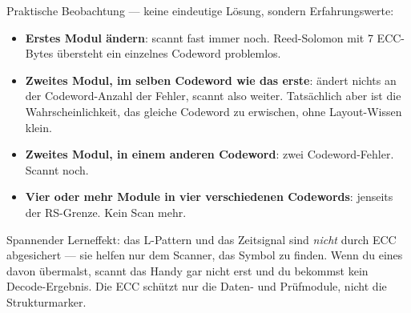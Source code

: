 Praktische Beobachtung — keine eindeutige Lösung, sondern Erfahrungswerte:

\begin{itemize}
\item \textbf{Erstes Modul ändern}: scannt fast immer noch.
  Reed-Solomon mit 7 ECC-Bytes übersteht ein einzelnes Codeword
  problemlos.
\item \textbf{Zweites Modul, im selben Codeword wie das erste}:
  ändert nichts an der Codeword-Anzahl der Fehler, scannt also
  weiter. Tatsächlich aber ist die Wahrscheinlichkeit, das gleiche
  Codeword zu erwischen, ohne Layout-Wissen klein.
\item \textbf{Zweites Modul, in einem anderen Codeword}: zwei
  Codeword-Fehler. Scannt noch.
\item \textbf{Vier oder mehr Module in vier verschiedenen
  Codewords}: jenseits der RS-Grenze. Kein Scan mehr.
\end{itemize}

Spannender Lerneffekt: das L-Pattern und das Zeitsignal sind
\emph{nicht} durch ECC abgesichert — sie helfen nur dem Scanner, das
Symbol zu finden. Wenn du eines davon übermalst, scannt das Handy
gar nicht erst und du bekommst kein Decode-Ergebnis. Die ECC
schützt nur die Daten- und Prüfmodule, nicht die Strukturmarker.
